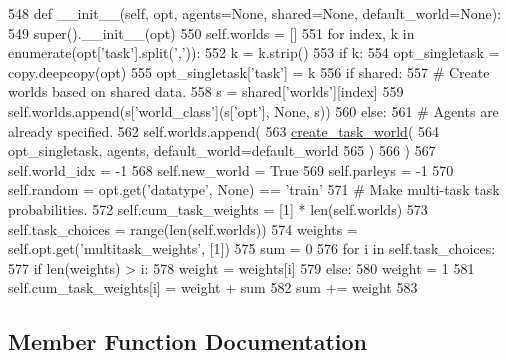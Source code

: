 \begin{DoxyCode}
548     \textcolor{keyword}{def }\_\_init\_\_(self, opt, agents=None, shared=None, default\_world=None):
549         super().\_\_init\_\_(opt)
550         self.worlds = []
551         \textcolor{keywordflow}{for} index, k \textcolor{keywordflow}{in} enumerate(opt[\textcolor{stringliteral}{'task'}].split(\textcolor{stringliteral}{','})):
552             k = k.strip()
553             \textcolor{keywordflow}{if} k:
554                 opt\_singletask = copy.deepcopy(opt)
555                 opt\_singletask[\textcolor{stringliteral}{'task'}] = k
556                 \textcolor{keywordflow}{if} shared:
557                     \textcolor{comment}{# Create worlds based on shared data.}
558                     s = shared[\textcolor{stringliteral}{'worlds'}][index]
559                     self.worlds.append(s[\textcolor{stringliteral}{'world\_class'}](s[\textcolor{stringliteral}{'opt'}], \textcolor{keywordtype}{None}, s))
560                 \textcolor{keywordflow}{else}:
561                     \textcolor{comment}{# Agents are already specified.}
562                     self.worlds.append(
563                         \hyperlink{namespaceparlai_1_1core_1_1worlds_a055ee493c9ed03ecff4832f52b408f8c}{create\_task\_world}(
564                             opt\_singletask, agents, default\_world=default\_world
565                         )
566                     )
567         self.world\_idx = -1
568         self.new\_world = \textcolor{keyword}{True}
569         self.parleys = -1
570         self.random = opt.get(\textcolor{stringliteral}{'datatype'}, \textcolor{keywordtype}{None}) == \textcolor{stringliteral}{'train'}
571         \textcolor{comment}{# Make multi-task task probabilities.}
572         self.cum\_task\_weights = [1] * len(self.worlds)
573         self.task\_choices = range(len(self.worlds))
574         weights = self.opt.get(\textcolor{stringliteral}{'multitask\_weights'}, [1])
575         sum = 0
576         \textcolor{keywordflow}{for} i \textcolor{keywordflow}{in} self.task\_choices:
577             \textcolor{keywordflow}{if} len(weights) > i:
578                 weight = weights[i]
579             \textcolor{keywordflow}{else}:
580                 weight = 1
581             self.cum\_task\_weights[i] = weight + sum
582             sum += weight
583 
\end{DoxyCode}


\subsection{Member Function Documentation}
\mbox{\label{classparlai_1_1core_1_1worlds_1_1MultiWorld_a03a162a9c53ed806221e46762d3fcb52}} 
